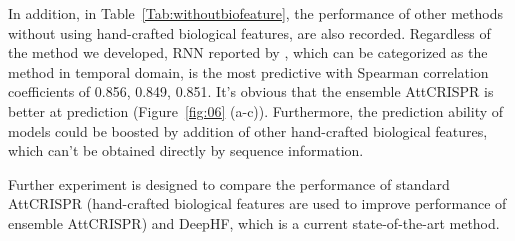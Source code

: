 \documentclass{bioinfo}
\begin{document}
In addition, in Table~\ref{Tab:withoutbiofeature}, the performance of other methods without using hand-crafted biological features, are also recorded. 
Regardless of the method we developed, RNN reported by \citeauthor{wang2019optimized}, which can be categorized as the method in temporal domain, 
is the most predictive with Spearman correlation coefficients of 0.856, 0.849, 0.851. 
It's obvious that the ensemble AttCRISPR is better at prediction (Figure~\ref{fig:06} (a-c)). 
Furthermore, the prediction ability of models could be boosted by addition of other hand-crafted biological features, which can't be obtained directly by sequence information. 

Further experiment is designed to compare the performance of standard AttCRISPR (hand-crafted biological features are used to improve performance of ensemble AttCRISPR)
 and DeepHF, which is a current state-of-the-art method.
\end{document}
